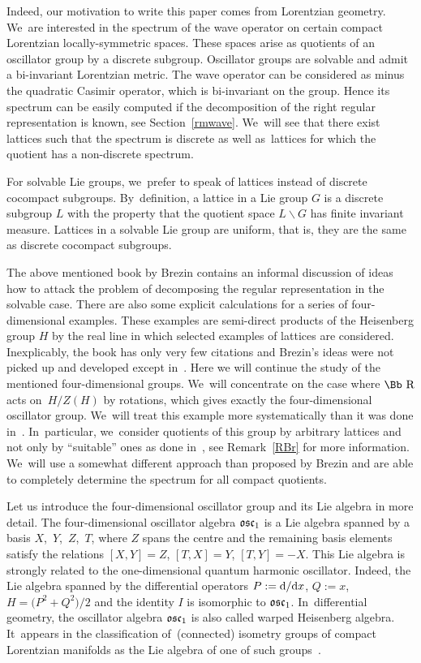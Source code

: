 \documentclass[10pt,a4paper]{amsart}
\newcommand\RR{{\mbox{\Bb R}}}
\newcommand\osc{\frak o \frak s \frak c}
\numberwithin{equation}{section}
\begin{document}
Indeed, our motivation to write this paper comes from Lorentzian geometry. We~are interested in the spectrum of the wave operator on certain compact Lorentzian locally-symmetric spaces. These spaces arise as quotients of an oscillator group by a discrete subgroup. Oscillator groups are solvable and admit a bi-invariant Lorentzian metric. The wave operator can be considered as minus the quadratic Casimir operator, which is bi-invariant on the group. Hence its spectrum can be easily computed if the decomposition of the right regular representation is known, see Section~\ref{rmwave}. We~will see that there exist lattices such that the spectrum is discrete as well as~lattices for which the quotient has a non-discrete spectrum.

For solvable Lie groups, we~prefer to speak of lattices instead of discrete cocompact subgroups. By~definition, a lattice in a Lie group $G$ is a discrete subgroup $L$ with the property that the quotient space $L\backslash G$ has finite invariant measure. Lattices in a solvable Lie group are uniform, that is, they are the same as discrete cocompact subgroups.

The above mentioned book by Brezin contains an informal discussion of ideas how to attack the problem of decomposing the regular representation in the solvable case. There are also some explicit calculations for a series of four-dimensional examples. These examples are semi-direct products of the Heisenberg group $H$ by the real line in which selected examples of lattices are considered. Inexplicably, the book has only very few citations and Brezin's ideas were not picked up and developed except in~\cite{Hu}. Here we will continue the study of the mentioned four-dimensional groups. We~will concentrate on the case where $\RR$ acts on~$H/Z(H)$ by rotations, which gives exactly the four-dimensional oscillator group. We~will treat this example more systematically than it was done in~\cite{Br}. In~particular, we~consider quotients of this group by arbitrary lattices and not only by ``suitable'' ones as done in~\cite{Br}, see Remark~\ref{RBr} for more information. We~will use a somewhat different approach than proposed by Brezin and are able to completely determine the spectrum for all compact quotients.

Let us introduce the four-dimensional oscillator group and its Lie algebra in more detail. The four-dimensional oscillator algebra $\osc_1$ is a Lie algebra spanned by a basis $X$,~$Y$,~$Z$,~$T$, where $Z$ spans the centre and the remaining basis elements satisfy the relations $[X,Y]=Z$, $[T,X]=Y$, $[T,Y]=-X$. This Lie algebra is strongly related to the one-dimensional quantum harmonic oscillator. Indeed, the Lie algebra spanned by the differential operators $P:={\rm d}/{\rm d}x$, \mbox{$Q:=x$}, $H=\big(P^2+Q^2\big)/2$ and the identity $I$ is isomorphic to $\osc_1$. In~differential geometry, the oscillator algebra $\osc_1$ is also called warped Heisenberg algebra. It~appears in the classification of~(con\-nected) isometry groups of compact Lorentzian manifolds as the Lie algebra of one of such groups~\cite{Z98}.
\end{document}
